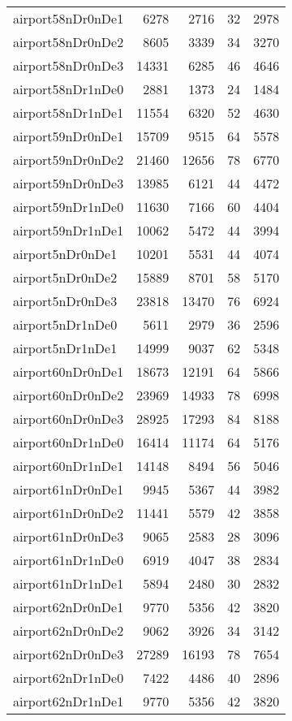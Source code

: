 \begin{longtable}{lrrrr}
airport58nDr0nDe1 & 6278 & 2716 & 32 & 2978 \\
airport58nDr0nDe2 & 8605 & 3339 & 34 & 3270 \\
airport58nDr0nDe3 & 14331 & 6285 & 46 & 4646 \\
airport58nDr1nDe0 & 2881 & 1373 & 24 & 1484 \\
airport58nDr1nDe1 & 11554 & 6320 & 52 & 4630 \\
airport59nDr0nDe1 & 15709 & 9515 & 64 & 5578 \\
airport59nDr0nDe2 & 21460 & 12656 & 78 & 6770 \\
airport59nDr0nDe3 & 13985 & 6121 & 44 & 4472 \\
airport59nDr1nDe0 & 11630 & 7166 & 60 & 4404 \\
airport59nDr1nDe1 & 10062 & 5472 & 44 & 3994 \\
airport5nDr0nDe1 & 10201 & 5531 & 44 & 4074 \\
airport5nDr0nDe2 & 15889 & 8701 & 58 & 5170 \\
airport5nDr0nDe3 & 23818 & 13470 & 76 & 6924 \\
airport5nDr1nDe0 & 5611 & 2979 & 36 & 2596 \\
airport5nDr1nDe1 & 14999 & 9037 & 62 & 5348 \\
airport60nDr0nDe1 & 18673 & 12191 & 64 & 5866 \\
airport60nDr0nDe2 & 23969 & 14933 & 78 & 6998 \\
airport60nDr0nDe3 & 28925 & 17293 & 84 & 8188 \\
airport60nDr1nDe0 & 16414 & 11174 & 64 & 5176 \\
airport60nDr1nDe1 & 14148 & 8494 & 56 & 5046 \\
airport61nDr0nDe1 & 9945 & 5367 & 44 & 3982 \\
airport61nDr0nDe2 & 11441 & 5579 & 42 & 3858 \\
airport61nDr0nDe3 & 9065 & 2583 & 28 & 3096 \\
airport61nDr1nDe0 & 6919 & 4047 & 38 & 2834 \\
airport61nDr1nDe1 & 5894 & 2480 & 30 & 2832 \\
airport62nDr0nDe1 & 9770 & 5356 & 42 & 3820 \\
airport62nDr0nDe2 & 9062 & 3926 & 34 & 3142 \\
airport62nDr0nDe3 & 27289 & 16193 & 78 & 7654 \\
airport62nDr1nDe0 & 7422 & 4486 & 40 & 2896 \\
airport62nDr1nDe1 & 9770 & 5356 & 42 & 3820 \\

\end{longtable}
